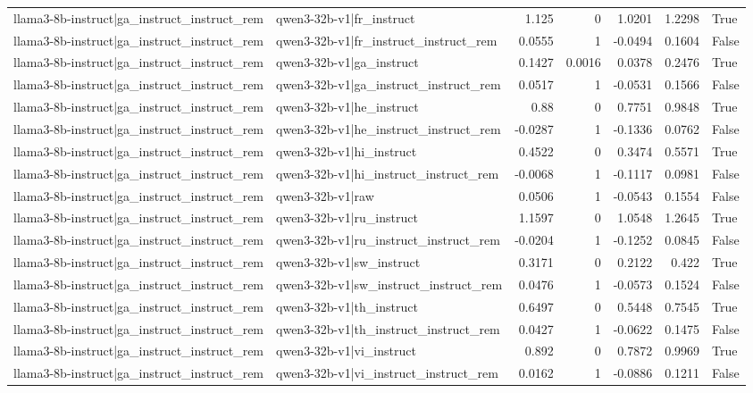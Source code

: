 \begin{table}
\begin{tabular}{l l r r r r l}
llama3-8b-instruct|ga_instruct_instruct_rem & qwen3-32b-v1|fr_instruct & 1.125 & 0 & 1.0201 & 1.2298 & True \\
llama3-8b-instruct|ga_instruct_instruct_rem & qwen3-32b-v1|fr_instruct_instruct_rem & 0.0555 & 1 & -0.0494 & 0.1604 & False \\
llama3-8b-instruct|ga_instruct_instruct_rem & qwen3-32b-v1|ga_instruct & 0.1427 & 0.0016 & 0.0378 & 0.2476 & True \\
llama3-8b-instruct|ga_instruct_instruct_rem & qwen3-32b-v1|ga_instruct_instruct_rem & 0.0517 & 1 & -0.0531 & 0.1566 & False \\
llama3-8b-instruct|ga_instruct_instruct_rem & qwen3-32b-v1|he_instruct & 0.88 & 0 & 0.7751 & 0.9848 & True \\
llama3-8b-instruct|ga_instruct_instruct_rem & qwen3-32b-v1|he_instruct_instruct_rem & -0.0287 & 1 & -0.1336 & 0.0762 & False \\
llama3-8b-instruct|ga_instruct_instruct_rem & qwen3-32b-v1|hi_instruct & 0.4522 & 0 & 0.3474 & 0.5571 & True \\
llama3-8b-instruct|ga_instruct_instruct_rem & qwen3-32b-v1|hi_instruct_instruct_rem & -0.0068 & 1 & -0.1117 & 0.0981 & False \\
llama3-8b-instruct|ga_instruct_instruct_rem & qwen3-32b-v1|raw & 0.0506 & 1 & -0.0543 & 0.1554 & False \\
llama3-8b-instruct|ga_instruct_instruct_rem & qwen3-32b-v1|ru_instruct & 1.1597 & 0 & 1.0548 & 1.2645 & True \\
llama3-8b-instruct|ga_instruct_instruct_rem & qwen3-32b-v1|ru_instruct_instruct_rem & -0.0204 & 1 & -0.1252 & 0.0845 & False \\
llama3-8b-instruct|ga_instruct_instruct_rem & qwen3-32b-v1|sw_instruct & 0.3171 & 0 & 0.2122 & 0.422 & True \\
llama3-8b-instruct|ga_instruct_instruct_rem & qwen3-32b-v1|sw_instruct_instruct_rem & 0.0476 & 1 & -0.0573 & 0.1524 & False \\
llama3-8b-instruct|ga_instruct_instruct_rem & qwen3-32b-v1|th_instruct & 0.6497 & 0 & 0.5448 & 0.7545 & True \\
llama3-8b-instruct|ga_instruct_instruct_rem & qwen3-32b-v1|th_instruct_instruct_rem & 0.0427 & 1 & -0.0622 & 0.1475 & False \\
llama3-8b-instruct|ga_instruct_instruct_rem & qwen3-32b-v1|vi_instruct & 0.892 & 0 & 0.7872 & 0.9969 & True \\
llama3-8b-instruct|ga_instruct_instruct_rem & qwen3-32b-v1|vi_instruct_instruct_rem & 0.0162 & 1 & -0.0886 & 0.1211 & False \\

\end{tabular}
\end{table}
